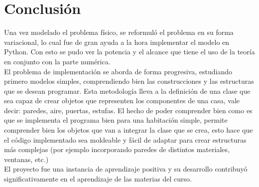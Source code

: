 \documentclass[12pt,paperletter]{article}
\begin{document}
\newpage

\section{Conclusión}




Una vez modelado el problema físico, se reformuló el problema en su forma variacional, lo cual fue de gran ayuda a la hora implementar el modelo en Python. Con esto se pudo ver la potencia y el alcance que tiene el uso de la teoría en conjunto con la parte numérica.\\

El problema de implementación se aborda de forma progresiva, estudiando primero modelos simples, comprendiendo bien las construcciones y las estructuras que se desean programar. Esta metodología lleva a la definición de una clase que sea capaz de crear objetos que representen los componentes de una casa, vale decir: paredes, aire, puertas, estufas. El hecho de poder comprender bien como es que se implementa el programa bien para una habitación simple, permite comprender bien los objetos que van a integrar la clase que se crea, esto hace que el código implementado sea moldeable y fácil de adaptar para crear estructuras más complejas (por ejemplo incorporando paredes de distintos materiales, ventanas, etc.)\\

El proyecto fue una instancia de aprendizaje positiva y su desarrollo contribuyó significativamente en el aprendizaje de las materias del curso.
\end{document}
